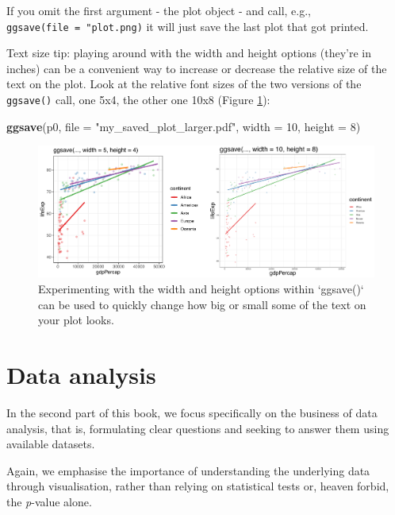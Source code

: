 \documentclass[
  12pt,
  krantz2]{krantz}
\makeatletter
\newenvironment{Shaded}{\begin{snugshade}}{\end{snugshade}}
\newcommand{\DataTypeTok}[1]{\textcolor[rgb]{0.13,0.29,0.53}{#1}}
\newcommand{\DecValTok}[1]{\textcolor[rgb]{0.00,0.00,0.81}{#1}}
\newcommand{\KeywordTok}[1]{\textcolor[rgb]{0.13,0.29,0.53}{\textbf{#1}}}
\newcommand{\NormalTok}[1]{#1}
\newcommand{\StringTok}[1]{\textcolor[rgb]{0.31,0.60,0.02}{#1}}
\newenvironment{kframe}{%
\medskip{}
\setlength{\fboxsep}{.8em}
 \def\at@end@of@kframe{}%
 \ifinner\ifhmode%
  \def\at@end@of@kframe{\end{minipage}}%
  \begin{minipage}{\columnwidth}%
 \fi\fi%
 \def\FrameCommand##1{\hskip\@totalleftmargin \hskip-\fboxsep
 \colorbox{shadecolor}{##1}\hskip-\fboxsep
     \hskip-\linewidth \hskip-\@totalleftmargin \hskip\columnwidth}%
 \MakeFramed {\advance\hsize-\width
   \@totalleftmargin\z@ \linewidth\hsize
   \@setminipage}}%
 {\par\unskip\endMakeFramed%
 \at@end@of@kframe}
\renewenvironment{Shaded}{\begin{kframe}}{\end{kframe}}
\makeatother
\begin{document}
If you omit the first argument - the plot object - and call, e.g., \texttt{ggsave(file\ =\ "plot.png)} it will just save the last plot that got printed.

Text size tip: playing around with the width and height options (they're in inches) can be a convenient way to increase or decrease the relative size of the text on the plot.
Look at the relative font sizes of the two versions of the \texttt{ggsave()} call, one 5x4, the other one 10x8 (Figure \ref{fig:chap05-fig-ggsave}):

\begin{Shaded}
\begin{Highlighting}[]
\KeywordTok{ggsave}\NormalTok{(p0, }\DataTypeTok{file =} \StringTok{"my_saved_plot_larger.pdf"}\NormalTok{, }\DataTypeTok{width =} \DecValTok{10}\NormalTok{, }\DataTypeTok{height =} \DecValTok{8}\NormalTok{)}
\end{Highlighting}
\end{Shaded}

\begin{figure}
\includegraphics[width=1\linewidth]{images/chapter05/healthyr_ggsave} \caption{Experimenting with the width and height options within `ggsave()` can be used to quickly change how big or small some of the text on your plot looks.}\label{fig:chap05-fig-ggsave}
\end{figure}

\hypertarget{part-data-analysis}{%
\part{Data analysis}\label{part-data-analysis}}

In the second part of this book, we focus specifically on the business of data analysis, that is, formulating clear questions and seeking to answer them using available datasets.

Again, we emphasise the importance of understanding the underlying data through visualisation, rather than relying on statistical tests or, heaven forbid, the \emph{p}-value alone.
\end{document}
